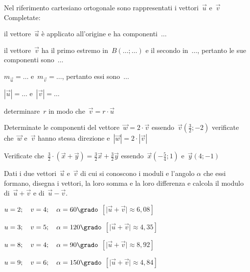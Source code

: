 \begin{multicols}{2}
\begin{esercizio}
\label{ese:vett.4}
Nel riferimento cartesiano ortogonale sono rappresentati i vettori~\(\vec{u}\) 
e~\(\vec{v}\) Completate:
\begin{enumeratea}
\item il vettore~\(\vec{u}\) è applicato all'origine e ha componenti~\(\ldots\)
\item il vettore~\(\vec{v}\) ha il primo estremo in~\(B(\ldots;\ldots)\) e il 
secondo in~\(\ldots\), pertanto le sue componenti sono~\(\ldots\)
\item \(m_{\vec{u}}=\ldots\) e~\(m_{\vec{v}}=\ldots\), pertanto essi sono~\(\ldots\)
\item \(|\vec{u}|=\ldots\) e~\(|\vec{v}|=\ldots\)
\item determinare~\(r\) in modo che~\(\vec{v}=r \cdot \vec{u}\)
\end{enumeratea}
\begin{center}
 
\end{center}
\end{esercizio}
\end{multicols}

\begin{esercizio}
\label{ese:vett.5}
Determinate le componenti del vettore~\(\vec{w}=2 \cdot \vec{v}\) 
essendo~\(\vec{v}(\frac {3}{2};-2)\) verificate che~\(\vec{w}\) e~\(\vec{v}\) hanno 
stessa direzione
e~\(|\vec{w}|=2 \cdot |\vec{v}|\)
\end{esercizio}

\begin{esercizio}
\label{ese:vett.6}
Verificate che~\(\frac {3}{2} \cdot (\vec{x}+\vec{y})=\frac {3}{2}\vec{x}+\frac 
{3}{2}\vec{y}\) essendo~\(\vec{x}(-\frac {5}{4};1)\) e~\(\vec{y}(4;-1)\)
\end{esercizio}

\begin{esercizio}
\label{ese:vett.7}
Dati i due vettori~\(\vec{u}\) e~\(\vec{v}\) di cui si conoscono i moduli e 
l'angolo \(\alpha\) che essi formano, disegna i vettori, 
la loro somma e la loro differenza e 
calcola il modulo di~\(\vec{u} + \vec{v}\) e di~\(\vec{u} - \vec{v}\).
\begin{enumeratea}
\item \(u=2; \quad v=4; \quad \alpha=60\grado\) 
 \hfill \(\left[\lvert\vec{u} + \vec{v} \rvert \approx 6,08\right]\)
\item \(u=3; \quad v=5; \quad \alpha=120\grado\) 
 \hfill \(\left[\lvert\vec{u} + \vec{v} \rvert \approx 4,35\right]\)
\item \(u=8; \quad v=4; \quad \alpha=90\grado\) 
 \hfill \(\left[\lvert\vec{u} + \vec{v} \rvert \approx 8,92\right]\)
\item \(u=9; \quad v=6; \quad \alpha=150\grado\) 
 \hfill \(\left[\lvert\vec{u} + \vec{v} \rvert \approx 4,84\right]\)
\end{enumeratea}
\end{esercizio}

